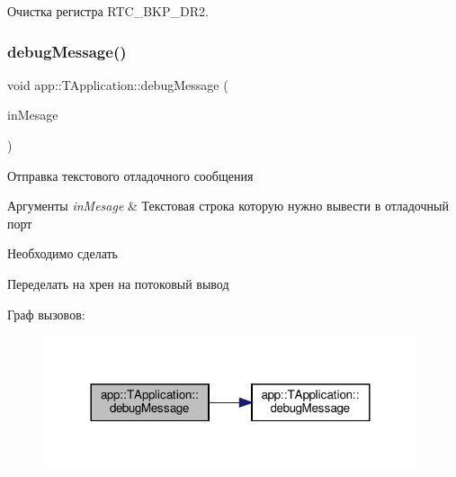  Очистка регистра R\+T\+C\+\_\+\+B\+K\+P\+\_\+\+D\+R2. \mbox{\label{classapp_1_1_t_application_abec229b87538c5db318ef57f25f6e84d}} 
\subsubsection{\texorpdfstring{debug\+Message()}{debugMessage()}\hspace{0.1cm}{\footnotesize\ttfamily [1/4]}}
{\footnotesize\ttfamily void app\+::\+T\+Application\+::debug\+Message (\begin{DoxyParamCaption}\item[{const std\+::string \&}]{in\+Mesage }\end{DoxyParamCaption})}



Отправка текстового отладочного сообщения 


\begin{DoxyParams}{Аргументы}
{\em in\+Mesage} & Текстовая строка которую нужно вывести в отладочный порт \\
\hline
\end{DoxyParams}
\begin{DoxyRefDesc}{Необходимо сделать}
\item[\hyperlink{todo__todo000001}{Необходимо сделать}]Переделать на хрен на потоковый вывод \end{DoxyRefDesc}
Граф вызовов\+:\nopagebreak
\begin{figure}[H]
\begin{center}
\leavevmode
\includegraphics[width=312pt]{classapp_1_1_t_application_abec229b87538c5db318ef57f25f6e84d_cgraph}
\end{center}
\end{figure}
\mbox{\label{classapp_1_1_t_application_ac0c8e394021c1d1ab4163bc8bd8f7b42}} 
